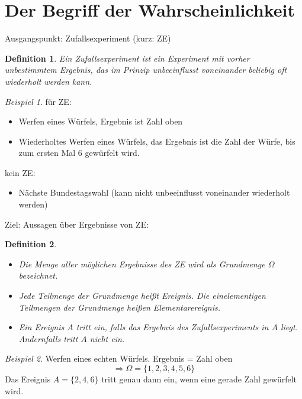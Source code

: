 \documentclass[linedtoc,longdoc,colorback,accentcolor=tud1a,bigchapter,leqno,12pt,article]{tudreport}
\theoremstyle{plain}
\newtheorem*{definition}{Definition}
\theoremstyle{plain}
\theoremstyle{remark}
\newtheorem*{beispiel}{Beispiel}
\newcommand{\impl}{\Rightarrow}
\begin{document}
\section{Der Begriff der Wahrscheinlichkeit}
Ausgangspunkt: Zufallsexperiment (kurz: ZE)
\begin{definition}
Ein \emph{Zufallsexperiment} ist ein Experiment mit vorher unbestimmtem Ergebnis, das im Prinzip unbeeinflusst voneinander beliebig oft wiederholt werden kann.
\end{definition}
\begin{beispiel}
für ZE:\\
\begin{itemize}
\item Werfen eines Würfels, Ergebnis ist Zahl oben
\item Wiederholtes Werfen eines Würfels, das Ergebnis ist die Zahl der Würfe, bis zum ersten Mal $6$ gewürfelt wird.
\end{itemize}
kein ZE:
\begin{itemize}
\item Nächste Bundestagswahl (kann nicht unbeeinflusst voneinander wiederholt werden)
\end{itemize}
\end{beispiel}
Ziel: Aussagen über Ergebnisse von ZE:
\begin{definition}
\begin{itemize}
\item Die Menge aller möglichen Ergebnisse des ZE wird als \emph{Grundmenge} $\Omega$ bezeichnet.
\item Jede Teilmenge der Grundmenge heißt \emph{Ereignis}. Die einelementigen Teilmengen der Grundmenge heißen \emph{Elementarereignis}.
\item Ein Ereignis $A$ \emph{tritt ein}, falls das Ergebnis des Zufallsexperiments in $A$ liegt. Andernfalls tritt $A$ nicht ein.
\end{itemize}
\end{definition}
\begin{beispiel}
Werfen eines echten Würfels. Ergebnis = Zahl oben
\[\impl\Omega=\{ 1,2,3,4,5,6\}\]
Das Ereignis $A=\{ 2,4,6\}$ tritt genau dann ein, wenn eine gerade Zahl gewürfelt wird.
\end{beispiel}
\end{document}
